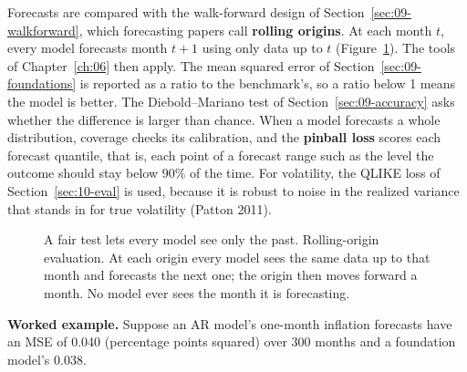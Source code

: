 Forecasts are compared with the walk-forward design of Section~\ref{sec:09-walkforward}, which forecasting papers call \textbf{rolling origins}. At each month $t$, every model forecasts month $t+1$ using only data up to $t$ (Figure~\ref{fig:21-rolling}). The tools of Chapter~\ref{ch:06} then apply. The mean squared error of Section~\ref{sec:09-foundations} is reported as a ratio to the benchmark's, so a ratio below 1 means the model is better. The Diebold--Mariano test of Section~\ref{sec:09-accuracy} asks whether the difference is larger than chance. When a model forecasts a whole distribution, coverage checks its calibration, and the \textbf{pinball loss} scores each forecast quantile, that is, each point of a forecast range such as the level the outcome should stay below 90\% of the time. For volatility, the QLIKE loss of Section~\ref{sec:10-eval} is used, because it is robust to noise in the realized variance that stands in for true volatility (Patton 2011).

\begin{figure}[htbp]
\centering
{}
\caption{A fair test lets every model see only the past. Rolling-origin evaluation. At each origin every model sees the same data up to that month and forecasts the next one; the origin then moves forward a month. No model ever sees the month it is forecasting.}
\label{fig:21-rolling}
\end{figure}

\textbf{Worked example.} Suppose an AR model's one-month inflation forecasts have an MSE of 0.040 (percentage points squared) over 300 months and a foundation model's 0.038.

